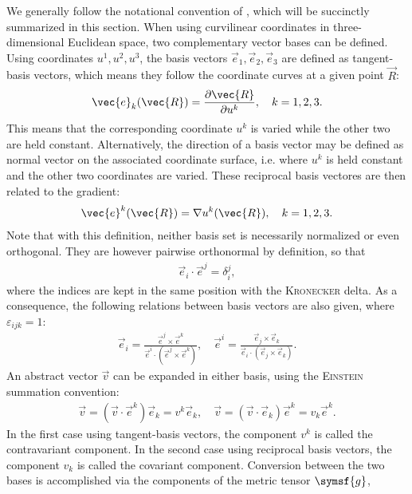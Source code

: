 We generally follow the notational convention of \textcite{dHaeseleer91}, which will be succinctly summarized in this section. When using curvilinear coordinates in three-dimensional Euclidean space, two complementary vector bases can be defined. Using coordinates $u^{1}, u^{2}, u^{3}$, the basis vectors $\vec{e}_{1}, \vec{e}_{2}, \vec{e}_{3}$ are defined as tangent-basis vectors, which means they follow the coordinate curves at a given point $\vec{R}$:
\begin{gather}
  \vec{e}_{k} (\vec{R}) = \pd[\vec{R}]{u^{k}}, \quad k = 1, 2, 3.
\end{gather}
This means that the corresponding coordinate $u^{k}$ is varied while the other two are held constant. Alternatively, the direction of a basis vector may be defined as normal vector on the associated coordinate surface, i.e. where $u^{k}$ is held constant and the other two coordinates are varied. These reciprocal basis vectores are then related to the gradient:
\begin{gather}
  \vec{e}^{k} (\vec{R}) = \grad u^{k} (\vec{R}), \quad k = 1, 2, 3.
\end{gather}
Note that with this definition, neither basis set is necessarily normalized or even orthogonal. They are however pairwise orthonormal by definition, so that
\begin{gather}
  \vec{e}_{i} \cdot \vec{e}^{j} = \delta_{i}^{j},
\end{gather}
where the indices are kept in the same position with the \textsc{Kronecker} delta. As a consequence, the following relations between basis vectors are also given, where $\varepsilon_{ijk} = 1$:
\begin{gather}
  \vec{e}_{i} = \frac{\vec{e}^{j} \times \vec{e}^{k}}{\vec{e}^{i} \cdot (\vec{e}^{j} \times \vec{e}^{k})}, \quad \vec{e}^{i} = \frac{\vec{e}_{j} \times \vec{e}_{k}}{\vec{e}_{i} \cdot (\vec{e}_{j} \times \vec{e}_{k})}.
\end{gather}
An abstract vector $\vec{v}$ can be expanded in either basis, using the \textsc{Einstein} summation convention:
\begin{gather}
  \vec{v} = (\vec{v} \cdot \vec{e}^{k}) \vec{e}_{k} = v^{k} \vec{e}_{k}, \quad \vec{v} = (\vec{v} \cdot \vec{e}_{k}) \vec{e}^{k} = v_{k} \vec{e}^{k}.
\end{gather}
In the first case using tangent-basis vectors, the component $v^{k}$ is called the contravariant component. In the second case using reciprocal basis vectors, the component $v_{k}$ is called the covariant component. Conversion between the two bases is accomplished via the components of the metric tensor $\symsf{g}$,
